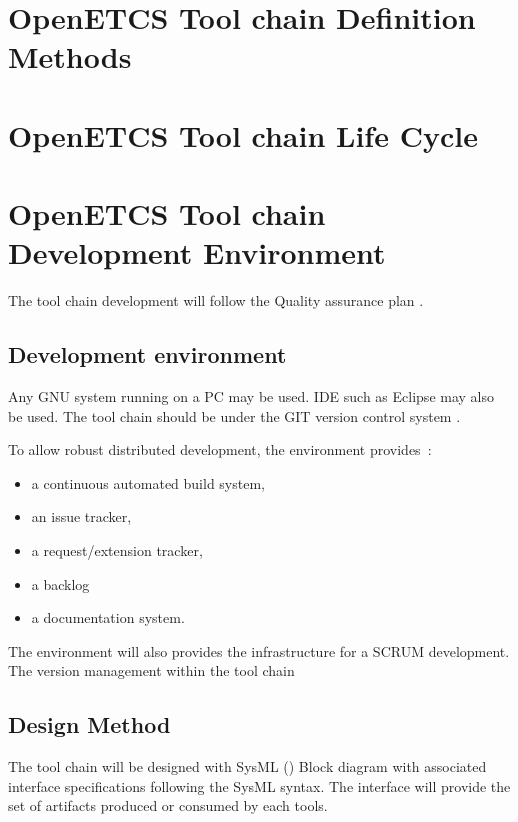 \documentclass{openetcs_article}
\begin{document}
\section{OpenETCS Tool chain Definition Methods}
\label{sec:toolchaindef}



\section{OpenETCS Tool chain Life Cycle}
\label{sec:lifecycle}


\section{OpenETCS Tool chain Development Environment}
\label{sec:env}
The tool chain development will follow the Quality assurance plan \cite{D1.3.1}.
\subsection{Development environment}
Any GNU system running on a PC may be used. \gls{IDE}  such as Eclipse may
also be used. 
The tool chain should be under the GIT  version control system
\cite{Chacon:2009}.


To allow robust distributed development, the  environment provides~:
\begin{itemize}
\item  a continuous automated build system,
\item an issue tracker,
\item a request/extension tracker,
\item a backlog
\item a  documentation system.

\end{itemize}
The environment will also provides the infrastructure for a SCRUM development.
The version management within the tool chain 

\subsection{Design Method}
The tool chain will be designed with SysML (\cite{SysML}) Block
diagram with associated interface specifications following the SysML syntax.
The interface will provide the set of artifacts produced or consumed by each tools.
\end{document}
